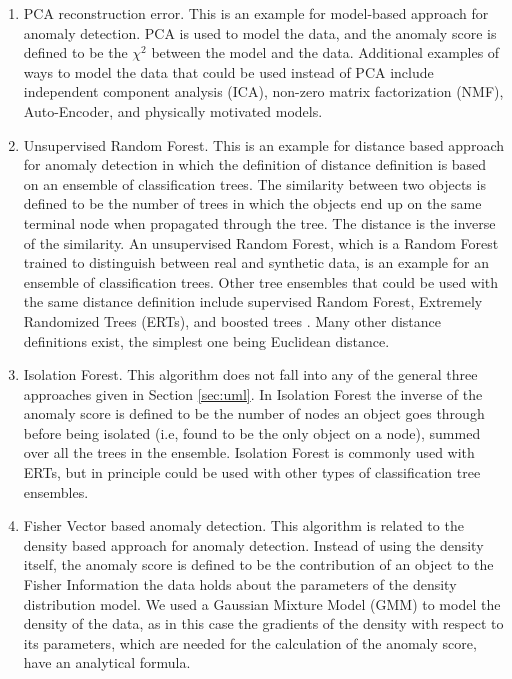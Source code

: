 \documentclass[fleqn,usenatbib]{mnras}
\begin{document}
{\begin{enumerate}

\item PCA reconstruction error. This is an example for model-based approach for anomaly detection. PCA  is used to model the data, and the anomaly score is defined to be the $\chi^2$  between the model and the data. Additional examples of ways to model the data that could be used instead of PCA include independent component analysis (ICA), non-zero matrix factorization (NMF), Auto-Encoder,  and physically motivated models.


\item Unsupervised Random Forest. This is an example for distance based approach for anomaly detection in which the definition of distance definition is based on an ensemble of classification trees. The similarity between two objects is defined to be the number of trees in which the objects end up on the same terminal node when propagated through the tree. The distance is the inverse of the similarity. An unsupervised Random Forest, which is a Random Forest \citep{breiman84} trained to distinguish between real and synthetic data, is an example for an ensemble of classification trees. Other  tree ensembles that could be used with the same distance definition include supervised Random Forest, Extremely Randomized Trees (ERTs), and boosted trees \citep[e.g AdaBoost,][]{freund97}. Many other distance definitions exist, the simplest one being Euclidean distance.

\item Isolation Forest. This algorithm does not fall into any of the general three approaches given in Section \ref{sec:uml}. In Isolation Forest the inverse of the anomaly score is defined to be the number of nodes an object goes through before being isolated (i.e, found to be the only object on a node), summed over all the trees in  the ensemble. Isolation Forest is commonly used with ERTs, but in principle could be used with other types of classification tree ensembles.

\item Fisher Vector based anomaly detection. This algorithm is related to the density based approach for anomaly detection. Instead of using the density itself, the anomaly score is defined to be the contribution of an object to the Fisher Information the data holds about the parameters of the density distribution model. We  used a Gaussian Mixture Model (GMM) to model the density of the data, as in this case the gradients of the density with respect to its parameters, which are needed for the calculation of the anomaly score, have an analytical formula. 


\end{enumerate}}
\end{document}
